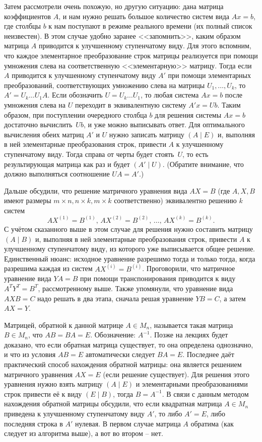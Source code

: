 \documentclass[10pt, a4paper]{extarticle}
\theoremstyle{definition}
\begin{document}
Затем рассмотрели очень похожую, но другую ситуацию: дана матрица коэффициентов $A$, и нам нужно решать большое количество систем вида $Ax=b$,
где столбцы $b$ к нам поступают в режиме реального времени (их полный список неизвестен). В этом случае удобно заранее <<запомнить>>, каким образом
матрица $A$ приводится к улучшенному ступенчатому виду. Для этого вспомним, что каждое элементарное преобразование строк матрицы реализуется при помощи
умножения слева на соответственную <<элементарную>> матрицу. Тогда если $A$ приводится к улучшенному ступенчатому виду $A'$ при помощи элементарных преобразований, 
соответствующих умножению слева на матрицы $U_1, \dots, U_k$, то $A' = U_k \dots U_1A$.
Если обозначить $U = U_k \dots U_1$, то любая система $Ax = b$ после умножения слева на $U$ переходит в эквивалентную систему $A'x = Ub$.
Таким образом, при поступлении очередного столбца $b$ для решения системы $Ax = b$ достаточно вычислить~$Ub$, и уже можно выписывать ответ.
Для оптимального вычисления обеих матриц $A'$ и $U$ нужно записать матрицу $(A \mid E)$ и, выполняя в ней элементарные преобразования строк, привести $A$ к улучшенному ступенчатому виду.
Тогда справа от черты будет стоять~$U$, то есть результирующая матрица как раз и будет $(A' \mid U)$. (Обратите внимание, что должно выполняться соотношение $UA = A'$.)

Дальше обсудили, что решение матричного уравнения вида $AX = B$ (где $A, X, B$ имеют размеры $m \times n, n \times k, m \times k$ соответственно) эквивалентно решению $k$ систем
\[
AX^{(1)} = B^{(1)}, \, AX^{(2)} = B^{(2)}, \, \dots, \, AX^{(k)} = B^{(k)}.
\]
С учётом сказанного выше в этом случае для решения нужно составить матрицу $(A \mid B)$ и, выполняя в ней элементарные преобразования строк, 
привести $A$ к улучшенному ступенчатому виду, из которого уже выписывается общее решение.
Единственный нюанс: исходное уравнение разрешимо тогда и только тогда, когда разрешима каждая из систем $AX^{(i)} = B^{(i)}$.
Проговорили, что матричное уравнение вида $YA = B$ при помощи транспонирования приводится к виду $A^TY^T = B^T$, рассмотренному выше.
Также упомянули, что уравнение вида $AXB = C$ надо решать в два этапа, сначала решая уравнение $YB = C$, а затем $AX = Y$.

Матрицей, обратной к данной матрице $A \in M_n$, называется такая матрица $B \in M_n$, что $AB = BA = E$. Обозначение: $A^{-1}$.
Позже на лекциях будет доказано, что если обратная матрица существует, то она определена однозначно, и что из условия $AB = E$ автоматически следует $BA=E$.
Последнее даёт практический способ нахождения обратной матрицы: она является решением матричного уравнения $AX = E$ (если решение существует).
Для решения этого уравнения нужно взять матрицу $(A \mid E)$ и элементарными преобразованиями строк привести её к виду $(E \mid B)$, тогда $B = A^{-1}$.
В связи с данным методом нахождения обратной матрицы обсудили, что если квадратная матрица $A \in M_n$ приведена к улучшенному ступенчатому виду $A'$, 
то либо $A' = E$, либо последняя строка в $A'$ нулевая. В первом случае матрица $A$ обратима (как следует из алгоритма выше), а вот во втором -- нет.
 
\end{document}
